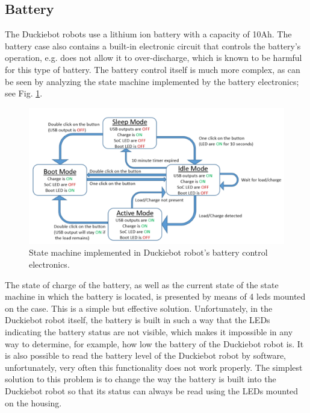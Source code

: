 \documentclass[conference]{IEEEtran}
\begin{document}


\subsection{Battery}
The Duckiebot robots use a lithium ion battery with a capacity of 10Ah. The battery case also contains a built-in electronic circuit that controls the battery's operation, e.g. does not allow it to over-discharge, which is known to be harmful for this type of battery. The battery control itself is much more complex, as can be seen by analyzing the state machine implemented by the battery electronics; see Fig. \ref{fig:battery-state-machine}.

\begin{figure}[ht!]
    \centering
    \includegraphics[width=1.0\columnwidth]{BatteryStateMachine.png}
    \caption{State machine implemented in Duckiebot robot's battery control electronics.}
    \label{fig:battery-state-machine}
\end{figure}

The state of charge of the battery, as well as the current state of the state machine in which the battery is located, is presented by means of 4 leds mounted on the case. This is a simple but effective solution. Unfortunately, in the Duckiebot robot itself, the battery is built in such a way that the LEDs indicating the battery status are not visible, which makes it impossible in any way to determine, for example, how low the battery of the Duckiebot robot is. It is also possible to read the battery level of the Duckiebot robot by software, unfortunately, very often this functionality does not work properly. The simplest solution to this problem is to change the way the battery is built into the Duckiebot robot so that its status can always be read using the LEDs mounted on the housing. 
\end{document}
